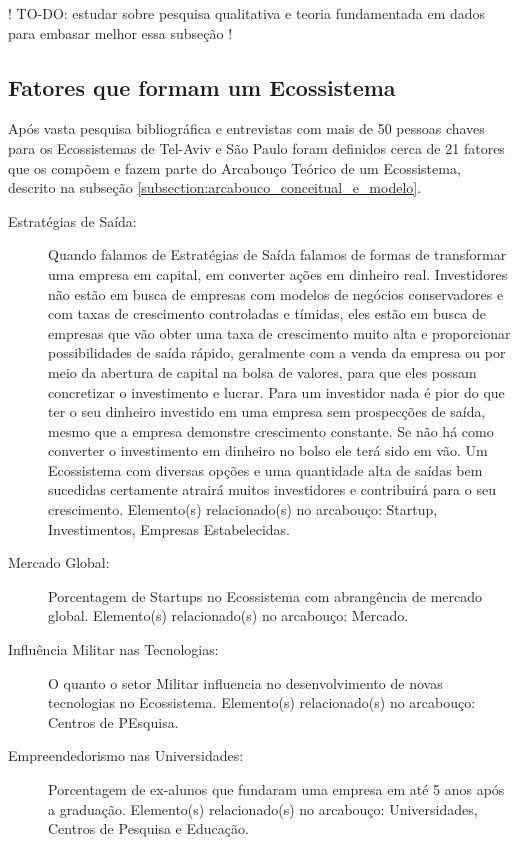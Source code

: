 ! TO-DO: estudar sobre pesquisa qualitativa e teoria fundamentada em dados para embasar melhor essa subseção !

\subsection{Fatores que formam um Ecossistema}
\label{subsection:fatores_que_formam_um_ecossistema}

Após vasta pesquisa bibliográfica e entrevistas com mais de 50 pessoas chaves para os Ecossistemas de Tel-Aviv e São Paulo foram definidos cerca de 21 fatores que os compõem e fazem parte do Arcabouço Teórico de um Ecossistema, descrito na subseção \ref{subsection:arcabouco_conceitual_e_modelo}. 

\begin{description}

  \item [Estratégias de Saída:] Quando falamos de Estratégias de Saída falamos de formas de transformar uma empresa em capital, em converter ações em dinheiro real. Investidores não estão em busca de empresas com modelos de negócios conservadores e com taxas de crescimento controladas e tímidas, eles estão em busca de empresas que vão obter uma taxa de crescimento muito alta e proporcionar possibilidades de saída rápido, geralmente com a venda da empresa ou por meio da abertura de capital na bolsa de valores, para que eles possam concretizar o investimento e lucrar. Para um investidor nada é pior do que ter o seu dinheiro investido em uma empresa sem prospecções de saída, mesmo que a empresa demonstre crescimento constante. Se não há como converter o investimento em dinheiro no bolso ele terá sido em vão. Um Ecossistema com diversas opções e uma quantidade alta de saídas bem sucedidas certamente atrairá muitos investidores e contribuirá para o seu crescimento. Elemento(s) relacionado(s) no arcabouço: Startup, Investimentos, Empresas Estabelecidas.

  \item [Mercado Global:] Porcentagem de Startups no Ecossistema com abrangência de mercado global. Elemento(s) relacionado(s) no arcabouço: Mercado.

  \item [Influência Militar nas Tecnologias: ] O quanto o setor Militar influencia no desenvolvimento de novas tecnologias no Ecossistema. Elemento(s) relacionado(s) no arcabouço: Centros de PEsquisa.

  \item [Empreendedorismo nas Universidades:] Porcentagem de ex-alunos que fundaram uma empresa em até 5 anos após a graduação. Elemento(s) relacionado(s) no arcabouço: Universidades, Centros de Pesquisa e Educação.


\end{description}
